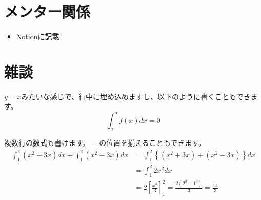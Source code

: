 \documentclass[a4paper,12pt]{ltjsarticle}
\begin{document}
\section{メンター関係}
\begin{itemize}
  \item Notionに記載
\end{itemize}
\clearpage

\section{雑談}
$y = x$みたいな感じで、行中に埋め込めますし、以下のように書くこともできます。\\

\begin{equation}
  \int_{a}^{a}f\left(x\right)dx = 0
\end{equation}

複数行の数式も書けます。$=$の位置を揃えることもできます。\\

\begin{align}
  \int_{1}^{2}\left(x^2 + 3x\right)dx + \int_{1}^{2}\left(x^2 - 3x\right)dx &= \int_{1}^{2}\left\{\left(x^2 + 3x\right) + \left(x^2 - 3x\right)\right\}dx \\
  &= \int_{1}^{2}2x^2dx \\
  &= 2\left[\frac{x^3}{3}\right]^2_1 = \frac{2\left(2^3 - 1^3\right)}{3} = \frac{14}{3}
\end{align}
\end{document}
